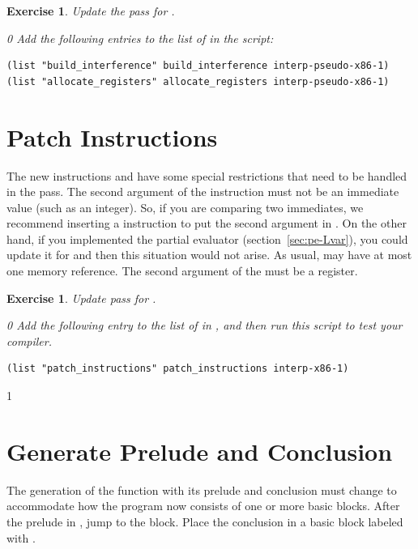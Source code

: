 \documentclass[7x10]{TimesAPriori_MIT}%
\def\racketEd{0}
\def\pythonEd{1}
\providecommand{\BookEdition}{1}
\let\edition\BookEdition
\newcommand{\pythonColor}[0]{}
\newtheorem{exercise}[theorem]{Exercise}
\numberwithin{theorem}{chapter}
\numberwithin{definition}{chapter}
\numberwithin{equation}{chapter}
\begin{document}
\begin{exercise}\normalfont\normalsize
Update the  pass for \LangXIfVar{}.
{\if\edition\racketEd
Add the following entries to the list of  in the
 script:
\begin{lstlisting}
(list "build_interference" build_interference interp-pseudo-x86-1)
(list "allocate_registers" allocate_registers interp-pseudo-x86-1)
\end{lstlisting}
\fi}
\end{exercise}


\section{Patch Instructions}

The new instructions  and  have some special
restrictions that need to be handled in the 
pass.
%
The second argument of the  instruction must not be an
immediate value (such as an integer). So, if you are comparing two
immediates, we recommend inserting a  instruction to put the
second argument in . On the other hand, if you implemented
the partial evaluator (section~\ref{sec:pe-Lvar}), you could
update it for \LangIf{} and then this situation would not arise.
%
As usual,  may have at most one memory reference.
%
The second argument of the  must be a register.

\begin{exercise}\normalfont\normalsize
%
Update  pass for \LangXIfVar{}.
%  
{\if\edition\racketEd
Add the following entry to the list of  in
, and then run this script to test your compiler.
\begin{lstlisting}
(list "patch_instructions" patch_instructions interp-x86-1)
\end{lstlisting}
\fi}
\end{exercise}


{\if\edition\pythonEd\pythonColor
  
\section{Generate Prelude and Conclusion}
\label{sec:prelude-conclusion-cond}

The generation of the  function with its prelude and
conclusion must change to accommodate how the program now consists of
one or more basic blocks. After the prelude in , jump to
the  block. Place the conclusion in a basic block labeled
with .

\fi}
\end{document}
